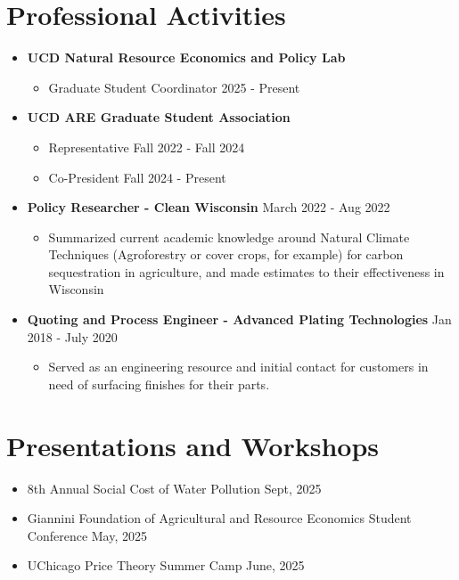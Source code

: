 \documentclass{article}[12]
\begin{document}
\section{Professional Activities}

\begin{itemize}[itemsep=0.75em]
    \item \textbf{UCD Natural Resource Economics and Policy Lab}
        \begin{itemize}
            \item Graduate Student Coordinator \hfill 2025 - Present
        \end{itemize}
    
    \item \textbf{UCD ARE Graduate Student Association}
    \begin{itemize}
        \item Representative \hfill Fall 2022 - Fall 2024
        \item Co-President \hfill Fall 2024 - Present
    \end{itemize}

   \item \textbf{Policy Researcher - Clean Wisconsin} \hfill March 2022 - Aug 2022
    \begin{itemize}
        \item  Summarized current academic knowledge around Natural Climate Techniques (Agroforestry or cover crops, for example) for carbon sequestration in agriculture, and made estimates to their effectiveness in Wisconsin
    \end{itemize}
    
    \item \textbf{Quoting and Process Engineer - Advanced Plating Technologies} \hfill Jan 2018 - July 2020
    \begin{itemize}
        \item Served as an engineering resource and initial contact for customers in need of surfacing finishes for their parts.  
    \end{itemize}

\end{itemize}

\section{Presentations and Workshops}
\begin{itemize}
    \item 8th Annual Social Cost of Water Pollution \hfill Sept, 2025
    \item Giannini Foundation of Agricultural and Resource Economics Student Conference \hfill May, 2025
    \item UChicago Price Theory Summer Camp \hfill June, 2025
\end{itemize}
\end{document}
